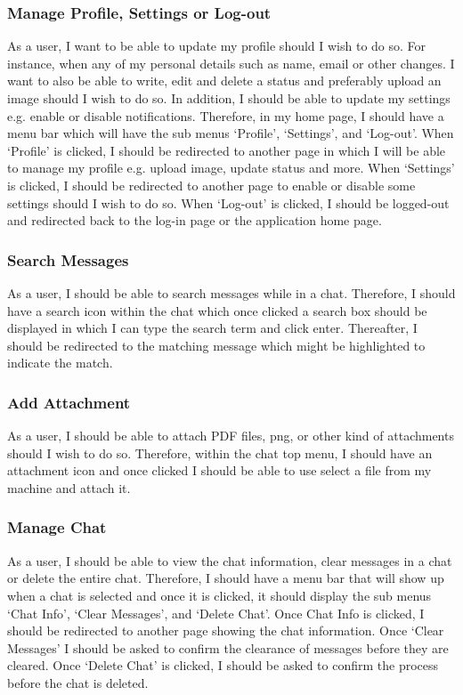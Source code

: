 \documentclass{article}
\begin{document}
    \subsubsection{Manage Profile, Settings or Log-out} 
    As a user, I want to be able to update my profile should I wish to do so. For instance, when any of my personal details such as name, email or other changes. I want to also be able to write, edit and delete a status and preferably upload an image should I wish to do so. In addition, I should be able to update my settings e.g. enable or disable notifications. Therefore, in my home page, I should have a menu bar which will have the sub menus ‘Profile’, ‘Settings’, and ‘Log-out’. When ‘Profile’ is clicked, I should be redirected to another page in which I will be able to manage my profile e.g. upload image, update status and more. When ‘Settings’ is clicked, I should be redirected to another page to enable or disable some settings should I wish to do so. When ‘Log-out’ is clicked, I should be logged-out and redirected back to the log-in page or the application home page.  
    
    \subsubsection{Search Messages}
    As a user, I should be able to search messages while in a chat. Therefore, I should have a search icon within the chat which once clicked a search box should be displayed in which I can type the search term and click enter. Thereafter, I should be redirected to the matching message which might be highlighted to indicate the match.  
    
    \subsubsection{Add Attachment}
    As a user, I should be able to attach PDF files, png, or other kind of attachments should I wish to do so. Therefore, within the chat top menu, I should have an attachment icon and once clicked I should be able to use select a file from my machine and attach it. 
    
    \subsubsection{Manage Chat}
    As a user, I should be able to view the chat information, clear messages in a chat or delete the entire chat. Therefore, I should have a menu bar that will show up when a chat is selected and once it is clicked, it should display the sub menus ‘Chat Info’, ‘Clear Messages’, and ‘Delete Chat’. Once Chat Info is clicked, I should be redirected to another page showing the chat information. Once ‘Clear Messages’ I should be asked to confirm the clearance of messages before they are cleared. Once ‘Delete Chat’ is clicked, I should be asked to confirm the process before the chat is deleted.
    
\end{document}
